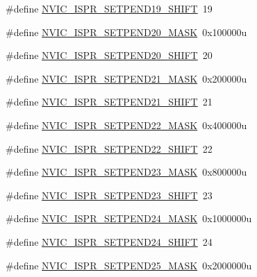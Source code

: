 \begin{DoxyCompactItemize}
\item 
\#define \hyperlink{group___n_v_i_c___register___masks_ga7add9b5bbebb525ba14a5b34bf72be21}{N\+V\+I\+C\+\_\+\+I\+S\+P\+R\+\_\+\+S\+E\+T\+P\+E\+N\+D19\+\_\+\+S\+H\+I\+FT}~19
\item 
\#define \hyperlink{group___n_v_i_c___register___masks_ga8143c7a68db9ce4bc433d0381bd8519a}{N\+V\+I\+C\+\_\+\+I\+S\+P\+R\+\_\+\+S\+E\+T\+P\+E\+N\+D20\+\_\+\+M\+A\+SK}~0x100000u
\item 
\#define \hyperlink{group___n_v_i_c___register___masks_ga9048fba04c34916329993182d769e65b}{N\+V\+I\+C\+\_\+\+I\+S\+P\+R\+\_\+\+S\+E\+T\+P\+E\+N\+D20\+\_\+\+S\+H\+I\+FT}~20
\item 
\#define \hyperlink{group___n_v_i_c___register___masks_ga0509a3a6e77f129e54c0dac04291349e}{N\+V\+I\+C\+\_\+\+I\+S\+P\+R\+\_\+\+S\+E\+T\+P\+E\+N\+D21\+\_\+\+M\+A\+SK}~0x200000u
\item 
\#define \hyperlink{group___n_v_i_c___register___masks_gaa4a3dc339ab7ba8958784b096d504c8a}{N\+V\+I\+C\+\_\+\+I\+S\+P\+R\+\_\+\+S\+E\+T\+P\+E\+N\+D21\+\_\+\+S\+H\+I\+FT}~21
\item 
\#define \hyperlink{group___n_v_i_c___register___masks_ga03df5679e9539bd889cdf29f7c7e7268}{N\+V\+I\+C\+\_\+\+I\+S\+P\+R\+\_\+\+S\+E\+T\+P\+E\+N\+D22\+\_\+\+M\+A\+SK}~0x400000u
\item 
\#define \hyperlink{group___n_v_i_c___register___masks_ga44b22c175e143668f2cf586525bc691a}{N\+V\+I\+C\+\_\+\+I\+S\+P\+R\+\_\+\+S\+E\+T\+P\+E\+N\+D22\+\_\+\+S\+H\+I\+FT}~22
\item 
\#define \hyperlink{group___n_v_i_c___register___masks_ga3a81c327c18c334702fc0124cac940d1}{N\+V\+I\+C\+\_\+\+I\+S\+P\+R\+\_\+\+S\+E\+T\+P\+E\+N\+D23\+\_\+\+M\+A\+SK}~0x800000u
\item 
\#define \hyperlink{group___n_v_i_c___register___masks_gafdcf1fc779198a5bcc7fbb4c71af3f01}{N\+V\+I\+C\+\_\+\+I\+S\+P\+R\+\_\+\+S\+E\+T\+P\+E\+N\+D23\+\_\+\+S\+H\+I\+FT}~23
\item 
\#define \hyperlink{group___n_v_i_c___register___masks_ga9b9cb5b568ea8371fc428d2d85638d03}{N\+V\+I\+C\+\_\+\+I\+S\+P\+R\+\_\+\+S\+E\+T\+P\+E\+N\+D24\+\_\+\+M\+A\+SK}~0x1000000u
\item 
\#define \hyperlink{group___n_v_i_c___register___masks_ga112b2981765398fa8be57b7a6c99d604}{N\+V\+I\+C\+\_\+\+I\+S\+P\+R\+\_\+\+S\+E\+T\+P\+E\+N\+D24\+\_\+\+S\+H\+I\+FT}~24
\item 
\#define \hyperlink{group___n_v_i_c___register___masks_ga7c53bed8116b67b5b159a94ef34957d5}{N\+V\+I\+C\+\_\+\+I\+S\+P\+R\+\_\+\+S\+E\+T\+P\+E\+N\+D25\+\_\+\+M\+A\+SK}~0x2000000u

\end{DoxyCompactItemize}
